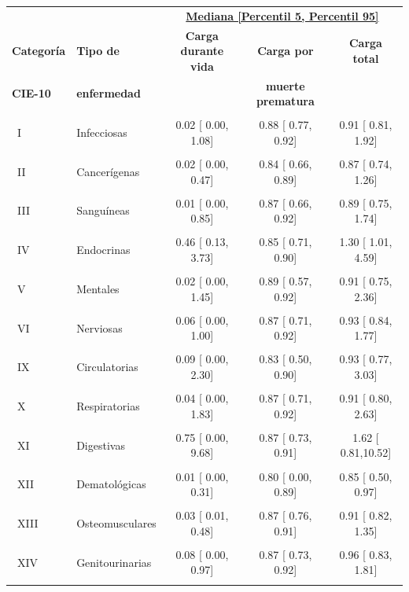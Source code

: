 \begin{tabular}{l l c c c}
\toprule[1.5pt]
& &\multicolumn{3}{c}{{\ul \textbf{ Mediana [Percentil 5, Percentil 95]}}} \\
\multicolumn{1}{c}{\textbf{Categoría}} & \textbf{Tipo de} & \textbf{Carga durante vida} & \textbf{Carga por} & \textbf{Carga total} \\ 
\textbf{ CIE-10} &\textbf{enfermedad} &  & \textbf{muerte prematura} & \\ \hline
\\
\ I & Infecciosas & 0.02 [ 0.00, 1.08] &  0.88 [ 0.77, 0.92] &  0.91 [ 0.81, 1.92] \\
\\
\ II &  Cancerígenas & 0.02 [ 0.00, 0.47] &  0.84 [ 0.66, 0.89] &  0.87 [ 0.74, 1.26] \\
\\
\ III & Sanguíneas &  0.01 [ 0.00, 0.85] &  0.87 [ 0.66, 0.92] &  0.89 [ 0.75, 1.74] \\
\\
\ IV & Endocrinas &  0.46 [ 0.13, 3.73] &  0.85 [ 0.71, 0.90] &  1.30 [ 1.01, 4.59] \\
\\
\ V & Mentales &  0.02 [ 0.00, 1.45] &  0.89 [ 0.57, 0.92] &  0.91 [ 0.75, 2.36] \\
\\
\ VI & Nerviosas & 0.06 [ 0.00, 1.00] &  0.87 [ 0.71, 0.92] &  0.93 [ 0.84, 1.77] \\
\\
\ IX & Circulatorias &  0.09 [ 0.00, 2.30] &  0.83 [ 0.50, 0.90] &  0.93 [ 0.77, 3.03] \\
\\
\ X & Respiratorias &  0.04 [ 0.00, 1.83] &  0.87 [ 0.71, 0.92] &  0.91 [ 0.80, 2.63] \\
\\
\ XI & Digestivas &  0.75 [ 0.00, 9.68] &  0.87 [ 0.73, 0.91] &  1.62 [ 0.81,10.52] \\
\\
\ XII & Dematológicas &  0.01 [ 0.00, 0.31] &  0.80 [ 0.00, 0.89] &  0.85 [ 0.50, 0.97] \\
\\
\ XIII & Osteomusculares &  0.03 [ 0.01, 0.48] &  0.87 [ 0.76, 0.91] &  0.91 [ 0.82, 1.35] \\
\\
\ XIV & Genitourinarias &  0.08 [ 0.00, 0.97] &  0.87 [ 0.73, 0.92] &  0.96 [ 0.83, 1.81] \\
\\

\end{tabular}
